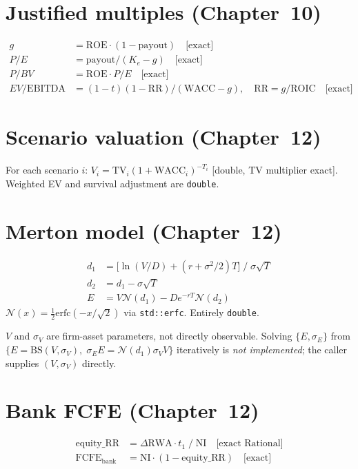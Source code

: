 \documentclass[12pt, a4paper, oneside]{book}
\newcommand{\FCFE}{\ensuremath{\mathrm{FCFE}}}
\newcommand{\WACC}{\ensuremath{\mathrm{WACC}}}
\newcommand{\ROIC}{\ensuremath{\mathrm{ROIC}}}
\newcommand{\ROE}{\ensuremath{\mathrm{ROE}}}
\newcommand{\TV}{\ensuremath{\mathrm{TV}}}
\newcommand{\Ke}{K_e}
\newcommand{\RR}{\mathrm{RR}}
\begin{document}
\section{Justified multiples (Chapter~10)}

\begin{align}
  g &= \ROE\cdot(1-\mathrm{payout}) \quad\text{[exact]}\\
  P/E &= \mathrm{payout}/(\Ke-g) \quad\text{[exact]}\\
  P/BV &= \ROE\cdot P/E \quad\text{[exact]}\\
  EV/\mathrm{EBITDA} &= (1-t)(1-\RR)/(\WACC-g),\quad
    \RR=g/\ROIC \quad\text{[exact]}
\end{align}

\section{Scenario valuation (Chapter~12)}

For each scenario $i$: $V_i = \TV_i(1+\WACC_i)^{-T_i}$ [double,
TV multiplier exact]. Weighted EV and survival adjustment are \texttt{double}.

\section{Merton model (Chapter~12)}

\begin{align}
  d_1 &= \bigl[\ln(V/D)+(r+\sigma^2/2)T\bigr]\;/\;\sigma\sqrt{T}\\
  d_2 &= d_1-\sigma\sqrt{T}\\
  E &= V\mathcal{N}(d_1)-De^{-rT}\mathcal{N}(d_2)
\end{align}
$\mathcal{N}(x)=\tfrac{1}{2}\mathrm{erfc}(-x/\sqrt{2})$ via
\texttt{std::erfc}. Entirely \texttt{double}.

\begin{warning}
$V$ and $\sigma_V$ are firm-asset parameters, not directly observable.
Solving $\{E, \sigma_E\}$ from $\{E=\mathrm{BS}(V,\sigma_V),\;\sigma_E E
= \mathcal{N}(d_1)\sigma_V V\}$ iteratively is \emph{not implemented};
the caller supplies $(V, \sigma_V)$ directly.
\end{warning}

\section{Bank FCFE (Chapter~12)}

\begin{align}
  \mathrm{equity\_RR} &= \Delta\mathrm{RWA}\cdot t_1\;/\;\mathrm{NI}
    \quad\text{[exact Rational]}\\
  \FCFE_{\mathrm{bank}} &= \mathrm{NI}\cdot(1-\mathrm{equity\_RR})
    \quad\text{[exact]}
\end{align}
\end{document}
